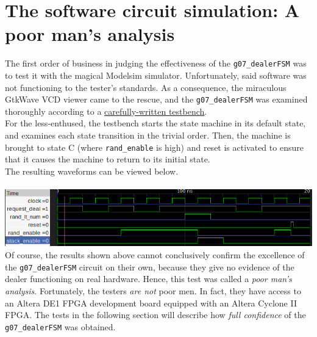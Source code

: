 \documentclass[12pt]{report}
\begin{document}
\section*{The software circuit simulation: A poor man's analysis}
The first order of business in judging the effectiveness of the \texttt{g07\_dealerFSM} was to test
it with the magical Modelsim simulator. Unfortunately, said software was not functioning to the
tester's standards. As a consequence, the miraculous GtkWave VCD viewer came to the rescue, and the
\texttt{g07\_dealerFSM} was examined thoroughly according to a
\hyperref[a:dealertst]{carefully-written testbench}. \\For the less-enthused, the testbench starts the
state machine in its default state, and examines each state transition in the trivial order. Then,
the machine is brought to state C (where \texttt{rand\_enable} is high) and reset is activated to
ensure that it causes the machine to return to its initial state.\\
The resulting waveforms can be viewed below.\\\\
\includegraphics[scale=0.75]{dealertestcropped}
Of course, the results shown above cannot conclusively confirm the excellence of the
\texttt{g07\_dealerFSM} circuit on their own, because they give no evidence of the dealer
functioning on real hardware. Hence, this test was called a \textit{poor man's
analysis}. Fortunately, the testers \textit{are not} poor men. In fact, they have access to an
Altera DE1 FPGA development board equipped with an Altera Cyclone II FPGA. The tests in the
following section will describe how \textit{full confidence} of the \texttt{g07\_dealerFSM} was
obtained.
\end{document}
